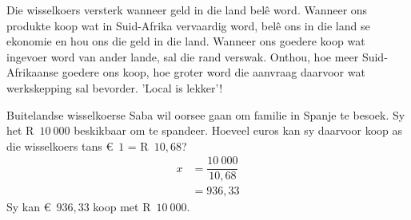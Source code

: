 Die wisselkoers versterk wanneer geld in die land bel\^e word. Wanneer ons produkte koop wat in Suid-Afrika vervaardig word, bel\^e ons in die land se ekonomie en hou ons die geld in die land. Wanneer ons goedere koop wat ingevoer word van ander lande, sal die rand verswak. Onthou, hoe meer Suid-Afrikaanse goedere ons koop, hoe groter word die aanvraag daarvoor wat werkskepping sal bevorder. 'Local is lekker'!
\par
{}

\begin{wex}{Buitelandse wisselkoerse}
    {Saba wil oorsee gaan om familie in Spanje te besoek. Sy het R~$10~000$ beskikbaar om te spandeer. Hoeveel euros kan sy daarvoor koop as die wisselkoers tans €~$1$ = R~$10,68$?}
{
\begin{align*}
 x &= \dfrac{10~000}{10,68}\\
&= 936,33
\end{align*}  
Sy kan €~$936,33$ koop met R~$10~000$.
}
\end{wex}


